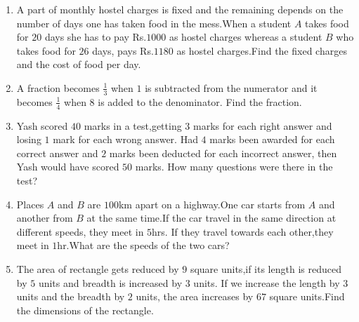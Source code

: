 \documentclass{article}
\theoremstyle{remark}
\begin{document}
\begin{enumerate}
\begin{enumerate}[label=(\roman*)]
\item A part of monthly hostel charges is fixed and the remaining depends on the number of days one has taken food in the mess.When a student $A$ takes food for $20$ days she has to pay Rs.$1000$ as hostel charges whereas a student $B$ who takes food for $26$ days, pays Rs.$1180$ as hostel charges.Find the fixed charges and the cost of food per day.
\item A fraction becomes $\frac{1}{3}$ when $1$ is subtracted from the numerator and it becomes $\frac{1}{4}$ when $8$ is added to the denominator. Find the fraction.
\item Yash scored $40$ marks in a test,getting $3$ marks for each right answer and losing $1$ mark for each wrong answer. Had $4$ marks been awarded for each correct answer and $2$ marks been deducted for each incorrect answer, then Yash would have scored $50$ marks. How many questions were there in the test?
\item Places $A$ and $B$ are $100$km apart on a highway.One car starts from $A$ and another from $B$ at the same time.If the car travel in the same direction at different speeds, they meet in $5$hrs. If they travel towards each other,they meet in $1$hr.What are the speeds of the two cars?
\item The area of rectangle gets reduced by $9$ square units,if its length is reduced by $5$ units and breadth is increased by $3$ units. If we increase the length by $3$ units and the breadth by $2$ units, the area increases by $67$ square units.Find the dimensions of the rectangle.
\end{enumerate}
\end{enumerate}
\end{document}
